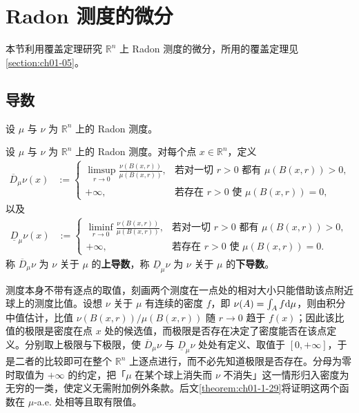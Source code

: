 \documentclass[../../main.tex]{subfiles}%
\begin{document}
\section{Radon 测度的微分}\label{section:ch01-06}

本节利用覆盖定理研究 $\mathbb{R}^n$ 上 Radon 测度的微分，所用的覆盖定理见\cref{section:ch01-05}。%

\subsection{导数}\label{subsection:ch01-06-1}

设 $\mu$ 与 $\nu$ 为 $\mathbb{R}^n$ 上的 Radon 测度。

\begin{definition}[上导数与下导数]\label{definition:ch01-1-20}
设 $\mu$ 与 $\nu$ 为 $\mathbb{R}^n$ 上的 Radon 测度。对每个点 $x\in\mathbb{R}^n$，定义
\begin{align*}
\overline{D}_{\mu}\nu(x)
&:=
\begin{cases}
\displaystyle\limsup_{r\to0}\frac{\nu(B(x,r))}{\mu(B(x,r))}, & \text{若对一切 } r>0 \text{ 都有 } \mu(B(x,r))>0,\\[10pt]
+\infty, & \text{若存在 } r>0 \text{ 使 } \mu(B(x,r))=0,
\end{cases}
\end{align*}
以及
\begin{align*}
\underline{D}_{\mu}\nu(x)
&:=
\begin{cases}
\displaystyle\liminf_{r\to0}\frac{\nu(B(x,r))}{\mu(B(x,r))}, & \text{若对一切 } r>0 \text{ 都有 } \mu(B(x,r))>0,\\[10pt]
+\infty, & \text{若存在 } r>0 \text{ 使 } \mu(B(x,r))=0.
\end{cases}
\end{align*}
称 $\overline{D}_{\mu}\nu$ 为 $\nu$ 关于 $\mu$ 的\textbf{上导数}，称 $\underline{D}_{\mu}\nu$ 为 $\nu$ 关于 $\mu$ 的\textbf{下导数}。
\end{definition}

\begin{remark}\label{remark:ch01-def-1-20-动机}
测度本身不带有逐点的取值，刻画两个测度在一点处的相对大小只能借助该点附近球上的测度比值。设想 $\nu$ 关于 $\mu$ 有连续的密度 $f$，即 $\nu(A)=\int_A f\mathrm{d}\mu$，则由积分中值估计，比值 $\nu(B(x,r))/\mu(B(x,r))$ 随 $r\to0$ 趋于 $f(x)$；因此该比值的极限是密度在点 $x$ 处的候选值，而极限是否存在决定了密度能否在该点定义。分别取上极限与下极限，使 $\overline{D}_{\mu}\nu$ 与 $\underline{D}_{\mu}\nu$ 处处有定义、取值于 $[0,+\infty]$，于是二者的比较即可在整个 $\mathbb{R}^n$ 上逐点进行，而不必先知道极限是否存在。分母为零时取值为 $+\infty$ 的约定，把「$\mu$ 在某个球上消失而 $\nu$ 不消失」这一情形归入密度为无穷的一类，使定义无需附加例外条款。后文\cref{theorem:ch01-1-29}将证明这两个函数在 $\mu$-a.e. 处相等且取有限值。%
\end{remark}
\end{document}
